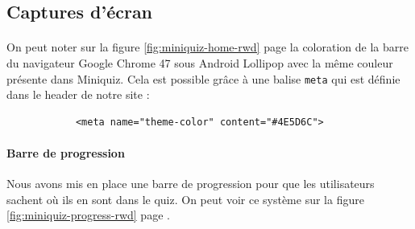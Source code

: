 \documentclass[12pt]{article}
\begin{document}
    \subsection{Captures d'écran}

        \paragraph{} On peut noter sur la figure \ref{fig:miniquiz-home-rwd} page \pageref{fig:miniquiz-home-rwd} la coloration de la barre du navigateur Google Chrome 47 sous Android Lollipop avec la même couleur présente dans Miniquiz. Cela est possible grâce à une balise \verb+meta+ qui est définie dans le header de notre site :
    
        \begin{verbatim}
            <meta name="theme-color" content="#4E5D6C">
        \end{verbatim}
        
        \paragraph{Barre de progression} Nous avons mis en place une barre de progression pour que les utilisateurs sachent où ils en sont dans le quiz. On peut voir ce système sur la figure \ref{fig:miniquiz-progress-rwd} page \pageref{fig:miniquiz-progress-rwd}.
    
\end{document}
